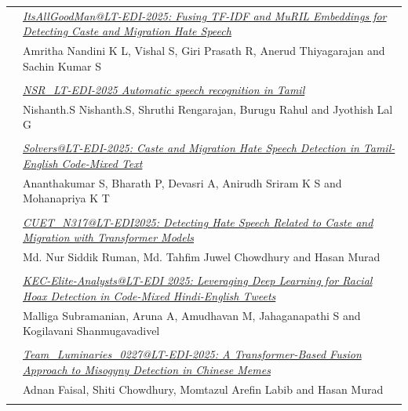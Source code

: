 \documentclass[11pt,oneside]{book}
\begin{document}
\begin{tabular}{p{24mm}p{124mm}}
                      & \hyperlink{page.90}{\emph{ItsAllGoodMan@LT-EDI-2025: Fusing TF-IDF and MuRIL Embeddings for Detecting Caste and Migration Hate Speech}}\\
        & Amritha Nandini K L\index{L}, Vishal S\index{S}, Giri Prasath R\index{R}, Anerud Thiyagarajan\index{Thiyagarajan} and Sachin Kumar S\index{S}\\\\
                
                      & \hyperlink{page.95}{\emph{NSR\_LT-EDI-2025 Automatic speech recognition in Tamil}}\\
        & Nishanth.S Nishanth.S\index{Nishanth.S}, Shruthi Rengarajan\index{Rengarajan}, Burugu Rahul\index{Rahul} and Jyothish Lal G\index{G}\\\\
                
                      & \hyperlink{page.100}{\emph{Solvers@LT-EDI-2025: Caste and Migration Hate Speech Detection in Tamil-English Code-Mixed Text}}\\
        & Ananthakumar S\index{S}, Bharath P\index{P}, Devasri A\index{A}, Anirudh Sriram K S\index{S} and Mohanapriya K T\index{T}\\\\
                
                      & \hyperlink{page.105}{\emph{CUET\_N317@LT-EDI2025: Detecting Hate Speech Related to Caste and Migration with Transformer Models}}\\
        & Md. Nur Siddik Ruman\index{Ruman}, Md. Tahfim Juwel Chowdhury\index{Chowdhury} and Hasan Murad\index{Murad}\\\\
                
                      & \hyperlink{page.111}{\emph{KEC-Elite-Analysts@LT-EDI 2025: Leveraging Deep Learning for Racial Hoax Detection in Code-Mixed Hindi-English Tweets}}\\
        & Malliga Subramanian\index{Subramanian}, Aruna A\index{A}, Amudhavan M\index{M}, Jahaganapathi S\index{S} and Kogilavani Shanmugavadivel\index{Shanmugavadivel}\\\\
                
                      & \hyperlink{page.116}{\emph{Team\_Luminaries\_0227@LT-EDI-2025: A Transformer-Based Fusion Approach to Misogyny Detection in Chinese Memes}}\\
        & Adnan Faisal\index{Faisal}, Shiti Chowdhury\index{Chowdhury}, Momtazul Arefin Labib\index{Labib} and Hasan Murad\index{Murad}\\\\
              \end{tabular}
\end{document}
